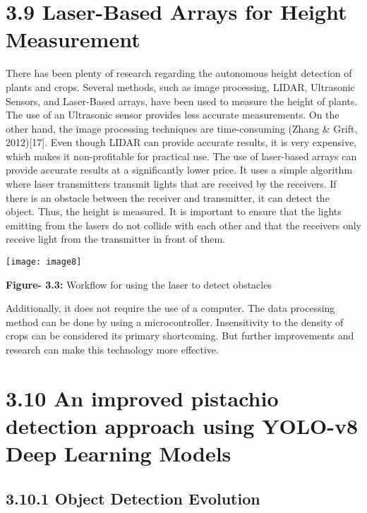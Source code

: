 \documentclass{book} %
\begin{document}
\noindent 

\noindent 
\section{3.9 Laser-Based Arrays for Height Measurement}

\noindent There has been plenty of research regarding the autonomous height detection of plants and crops. Several methods, such as image processing, LIDAR, Ultrasonic Sensors, and Laser-Based arrays, have been used to measure the height of plants. The use of an Ultrasonic sensor provides less accurate measurements. On the other hand, the image processing techniques are time-consuming (Zhang \& Grift, 2012)[17]. Even though LIDAR can provide accurate results, it is very expensive, which makes it non-profitable for practical use. The use of laser-based arrays can provide accurate results at a significantly lower price. It uses a simple algorithm where laser transmitters transmit lights that are received by the receivers. If there is an obstacle between the receiver and transmitter, it can detect the object. Thus, the height is measured. It is important to ensure that the lights emitting from the lasers do not collide with each other and that the receivers only receive light from the transmitter in front of them.

\noindent 

\texttt{[image: image8]}

\textbf{Figure- 3.3:} Workflow for using the laser to detect obstacles



\noindent Additionally, it does not require the use of a computer. The data processing method can be done by using a microcontroller. Insensitivity to the density of crops can be considered its primary shortcoming. But further improvements and research can make this technology more effective. 

\noindent 

\noindent 
\section{3.10 An improved pistachio detection approach using   YOLO-v8 Deep Learning Models}

\noindent 

\noindent 
\subsection{3.10.1 Object Detection Evolution}
\end{document}
